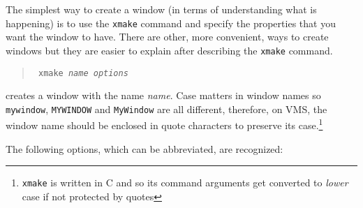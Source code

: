 The simplest way to create a window (in terms of understanding what is
happening) is to use the {\tt xmake} command and specify the properties that
you want the window to have. There are other, more convenient, ways to create
windows but they are easier to explain after describing the {\tt xmake} command.
\begin{quote}\tt
xmake {\em name} {\em options}
\end{quote}
creates a window with the name {\em name}. Case matters in window names so {\tt
mywindow}, {\tt MYWINDOW} and {\tt MyWindow} are all different, therefore, on 
VMS, the window name should be enclosed in quote characters to preserve its
case.\footnote{{\tt xmake} is written in C and so its command arguments get
converted to {\em lower} case if not protected by quotes}

The following options, which can be abbreviated, are recognized:
